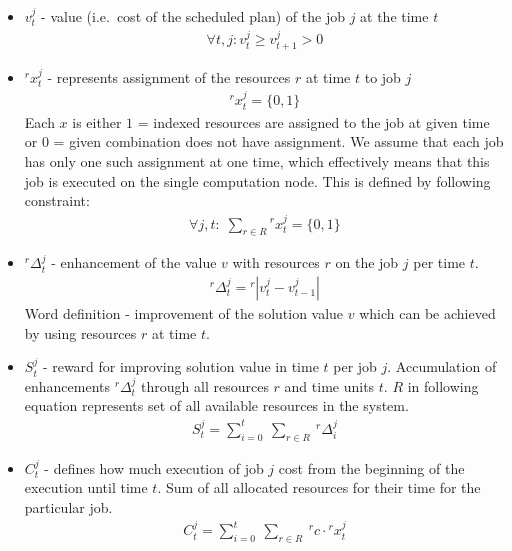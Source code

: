 \begin{itemize}
    \item $v_{t}^{j}$ - value (i.e.\ cost of the scheduled plan) of the job $j$ at the time $t$
    \begin{align*}
        \forall t, j: v_{t}^{j} \geq v_{t+1}^{j} > 0
    \end{align*}
    \item $^{r}x_{t}^{j}$ - represents assignment of the resources $r$ at time $t$ to job $j$
    \begin{align*}
        ^{r}x_{t}^{j} = \{0, 1\}
    \end{align*}
    Each $x$ is either $1$ = indexed resources are assigned to the job at given time or $0$ = given combination does not have assignment.
    We assume that each job has only one such assignment at one time,
    which effectively means that this job is executed on the single computation node.
    This is defined by following constraint:
    \begin{align*}
        \forall j, t:\; \sum_{r \in R} {}^{r}x_{t}^{j} = \{0, 1\}
    \end{align*}
    \item $^{r}\Delta_{t}^{j}$ - enhancement of the value $v$ with resources $r$ on the job $j$ per time $t$.
    \begin{align*}
        ^{r}\Delta_{t}^{j} = {}^{r}| v_{t}^{j} - v_{t-1}^{j}|
    \end{align*}
    Word definition - improvement of the solution value $v$ which can be achieved by using resources $r$ at time $t$.
    \item $S_{t}^{j}$ - reward for improving solution value in time $t$ per job $j$.
    Accumulation of enhancements $^{r}\Delta_{t}^{j}$ through all resources $r$ and time units $t$.
    $R$ in following equation represents set of all available resources in the system.
    \begin{align*}
        S_{t}^{j} = \sum_{i = 0}^{t}\:\sum_{r \in R}\: {}^{r}\Delta_{i}^{j}
    \end{align*}
    \item $C_{t}^{j}$ - defines how much execution of job $j$ cost from the beginning of the execution until time $t$.
    Sum of all allocated resources for their time for the particular job.
    \begin{align*}
        C_{t}^{j} = \sum_{i = 0}^{t}\:\sum_{r \in R}\: {}^{r}c \cdot {}^{r}x_{t}^{j}
    \end{align*}
\end{itemize}


